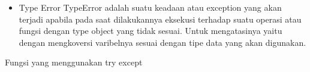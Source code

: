 \begin{enumerate}
\begin{itemize}
\item Type Error
TypeError adalah suatu keadaan atau exception yang akan terjadi apabila pada saat dilakukannya eksekusi terhadap suatu operasi atau fungsi dengan type object yang tidak sesuai. Untuk mengatasinya yaitu dengan mengkoversi varibelnya sesuai dengan tipe data yang akan digunakan.
\end{itemize}

Fungsi yang menggunakan try except


\end{enumerate}
